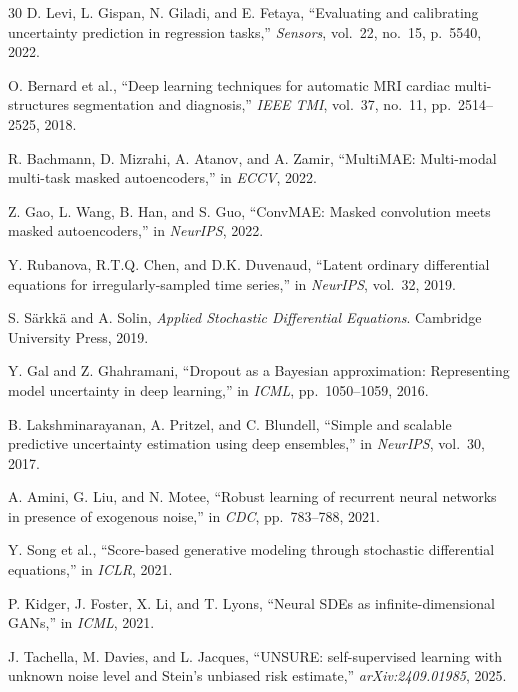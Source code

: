 \documentclass[10pt,twocolumn]{article}
\begin{document}
\begin{thebibliography}{30}
D. Levi, L. Gispan, N. Giladi, and E. Fetaya, ``Evaluating and calibrating uncertainty prediction in regression tasks,'' \emph{Sensors}, vol.~22, no.~15, p.~5540, 2022.

O. Bernard et al., ``Deep learning techniques for automatic MRI cardiac multi-structures segmentation and diagnosis,'' \emph{IEEE TMI}, vol.~37, no.~11, pp.~2514--2525, 2018.

R. Bachmann, D. Mizrahi, A. Atanov, and A. Zamir, ``MultiMAE: Multi-modal multi-task masked autoencoders,'' in \emph{ECCV}, 2022.

Z. Gao, L. Wang, B. Han, and S. Guo, ``ConvMAE: Masked convolution meets masked autoencoders,'' in \emph{NeurIPS}, 2022.

Y. Rubanova, R.T.Q. Chen, and D.K. Duvenaud, ``Latent ordinary differential equations for irregularly-sampled time series,'' in \emph{NeurIPS}, vol.~32, 2019.

S. S\"{a}rkk\"{a} and A. Solin, \emph{Applied Stochastic Differential Equations}. Cambridge University Press, 2019.

Y. Gal and Z. Ghahramani, ``Dropout as a Bayesian approximation: Representing model uncertainty in deep learning,'' in \emph{ICML}, pp.~1050--1059, 2016.

B. Lakshminarayanan, A. Pritzel, and C. Blundell, ``Simple and scalable predictive uncertainty estimation using deep ensembles,'' in \emph{NeurIPS}, vol.~30, 2017.

A. Amini, G. Liu, and N. Motee, ``Robust learning of recurrent neural networks in presence of exogenous noise,'' in \emph{CDC}, pp.~783--788, 2021.

Y. Song et al., ``Score-based generative modeling through stochastic differential equations,'' in \emph{ICLR}, 2021.

P. Kidger, J. Foster, X. Li, and T. Lyons, ``Neural SDEs as infinite-dimensional GANs,'' in \emph{ICML}, 2021.

J. Tachella, M. Davies, and L. Jacques, ``UNSURE: self-supervised learning with unknown noise level and Stein's unbiased risk estimate,'' \emph{arXiv:2409.01985}, 2025.

\end{thebibliography}
\end{document}
